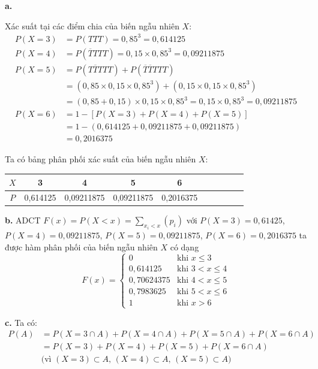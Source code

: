 \documentclass[12pt]{article}
\begin{document}
\begin{itemize}
    \textbf{a.}
    \begin{spacing}{1.3}
    Xác suất tại các điểm chia của biến ngẫu nhiên $X$:
    \begin{align*}
        P(X = 3) &= P(TTT) = 0,85^3 = 0,614125 \\
        P(X = 4) &= P(\overline{T}TTT) = 0,15 \times 0,85^3 = 0,09211875 \\
        P(X = 5) &= P(T\overline{T}TTT) + P(\overline{T}\overline{T}TTT) \\
        &= (0,85 \times 0,15 \times 0,85^3) + (0,15 \times 0,15 \times 0,85^3) \\
        &= (0,85 + 0,15) \times 0,15 \times 0,85^3 = 0,15 \times 0,85^3 = 0,09211875 \\
        P(X = 6) &= 1 - [P(X = 3) + P(X = 4) + P(X = 5)] \\
        &= 1 - (0,614125 + 0,09211875 + 0,09211875) \\
        &= 0,2016375
    \end{align*}
    
    Ta có bảng phân phối xác suất của biến ngẫu nhiên $X$:
    \begin{center}
        \begin{tabular}{|Sc|Sc|Sc|Sc|Sc|}
            \hline
            $X$ & 3 & 4 & 5 & 6 \\
            \hline
            $P$ & 0,614125 & 0,09211875 & 0,09211875 & 0,2016375 \\
            \hline
        \end{tabular}
    \end{center}
    
    \textbf{b.}
    ADCT $\displaystyle F(x) = P(X < x) = \sum_{x_i < x} (p_i)$ với $P(X=3) = 0,61425$, \\ $P(X=4) = 0,09211875$, $P(X=5) = 0,09211875$, $P(X=6) = 0,2016375$ ta được hàm phân phối của biến ngẫu nhiên $X$ có dạng
    \[ F(x) = \begin{cases} 
        0 & \text{khi } x \le 3 \\ 
        0,614125 & \text{khi } 3 < x \le 4 \\ 
        0,70624375 & \text{khi } 4 < x \le 5 \\ 
        0,7983625 & \text{khi } 5 < x \le 6 \\
        1 & \text{khi } x > 6
    \end{cases} \]
    
    \textbf{c.}
   Ta có:
    \[
    \begin{aligned}
        P(A) &= P(X=3 \cap A) + P(X=4 \cap A) + P(X=5 \cap A) + P(X=6 \cap A) \\
        &= P(X=3) + P(X=4) + P(X=5) + P(X=6 \cap A) \\
        &\text{(vì } (X=3) \subset A, \, (X=4) \subset A, \, (X=5) \subset A)
    \end{aligned}
    \]


\end{spacing}
\end{itemize}
\end{document}
